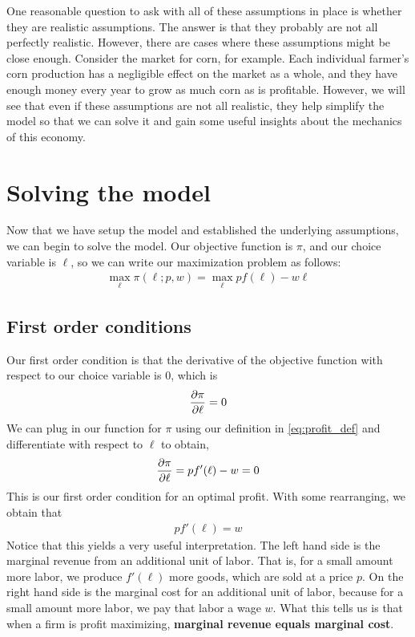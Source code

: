 One reasonable question to ask with all of these assumptions in place is whether they are realistic assumptions. The answer is that they probably are not all perfectly realistic. However, there are cases where these assumptions might be close enough. Consider the market for corn, for example. Each individual farmer's corn production has a negligible effect on the market as a whole, and they have enough money every year to grow as much corn as is profitable. However, we will see that even if these assumptions are not all realistic, they help simplify the model so that we can solve it and gain some useful insights about the mechanics of this economy. 

\section{Solving the model} \label{sec:solving_model}
Now that we have setup the model and established the underlying assumptions, we can begin to solve the model. Our objective function is $\pi$, and our choice variable is $\ell$, so we can write our maximization problem as follows:
\begin{align}
    \max_{\ell} \pi(\ell; p, w) = \max_{\ell} p f(\ell) - w \ell
\end{align}

\subsection{First order conditions}
Our first order condition is that the derivative of the objective function with respect to our choice variable is 0, which is
\begin{align}
    \frac{\partial \pi}{\partial \ell} = 0 \label{eq:profit_foc}
\end{align}
We can plug in our function for $\pi$ using our definition in \ref{eq:profit_def} and differentiate with respect to $\ell$ to obtain,
\begin{align}
    \frac{\partial \pi}{\partial \ell} = p f'(\ell) - w = 0
\end{align}
This is our first order condition for an optimal profit. With some rearranging, we obtain that
\begin{align}
    p f'(\ell) = w 
\end{align}
Notice that this yields a very useful interpretation. The left hand side is the marginal revenue from an additional unit of labor. That is, for a small amount more labor, we produce $f'(\ell)$ more goods, which are sold at a price $p$. On the right hand side is the marginal cost for an additional unit of labor, because for a small amount more labor, we pay that labor a wage $w$. What this tells us is that when a firm is profit maximizing, \textbf{marginal revenue equals marginal cost}. 

